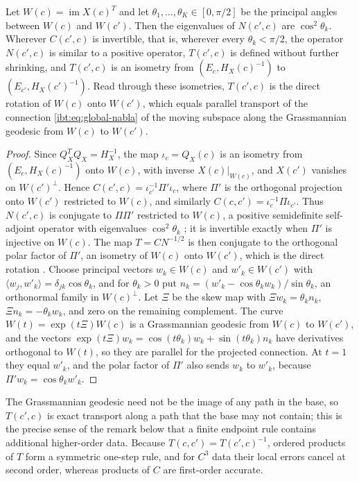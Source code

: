 Let $W(c)=\operatorname{im}X(c)^T$ and let $\theta_1,\dots,\theta_K\in[0,\pi/2]$ be the principal angles between $W(c)$ and $W(c')$. Then the eigenvalues of $N(c',c)$ are $\cos^2\theta_k$. Wherever $C(c',c)$ is invertible, that is, wherever every $\theta_k<\pi/2$, the operator $N(c',c)$ is similar to a positive operator, $T(c',c)$ is defined without further shrinking, and $T(c',c)$ is an isometry from $(E_c,H_X(c)^{-1})$ to $(E_{c'},H_X(c')^{-1})$. Read through these isometries, $T(c',c)$ is the direct rotation of $W(c)$ onto $W(c')$, which equals parallel transport of the connection \cref{ibt:eq:global-nabla} of the moving subspace along the Grassmannian geodesic from $W(c)$ to $W(c')$.
\begin{proof}
Since $Q_X^TQ_X=H_X^{-1}$, the map $\iota_c=Q_X(c)$ is an isometry from $(E_c,H_X(c)^{-1})$ onto $W(c)$, with inverse $X(c)|_{W(c)}$, and $X(c')$ vanishes on $W(c')^\perp$. Hence $C(c',c)=\iota_{c'}^{-1}\Pi'\iota_c$, where $\Pi'$ is the orthogonal projection onto $W(c')$ restricted to $W(c)$, and similarly $C(c,c')=\iota_c^{-1}\Pi\iota_{c'}$. Thus $N(c',c)$ is conjugate to $\Pi\Pi'$ restricted to $W(c)$, a positive semidefinite self-adjoint operator with eigenvalues $\cos^2\theta_k$ \citep{BjorckGolub1973}; it is invertible exactly when $\Pi'$ is injective on $W(c)$. The map $T=CN^{-1/2}$ is then conjugate to the orthogonal polar factor of $\Pi'$, an isometry of $W(c)$ onto $W(c')$, which is the direct rotation \citep{DavisKahan1970}. Choose principal vectors $w_k\in W(c)$ and $w'_k\in W(c')$ with $\langle w_j,w'_k\rangle=\delta_{jk}\cos\theta_k$, and for $\theta_k>0$ put $n_k=(w'_k-\cos\theta_k w_k)/\sin\theta_k$, an orthonormal family in $W(c)^\perp$. Let $\Xi$ be the skew map with $\Xi w_k=\theta_kn_k$, $\Xi n_k=-\theta_kw_k$, and zero on the remaining complement. The curve $W(t)=\exp(t\Xi)W(c)$ is a Grassmannian geodesic from $W(c)$ to $W(c')$, and the vectors $\exp(t\Xi)w_k=\cos(t\theta_k)w_k+\sin(t\theta_k)n_k$ have derivatives orthogonal to $W(t)$, so they are parallel for the projected connection. At $t=1$ they equal $w'_k$, and the polar factor of $\Pi'$ also sends $w_k$ to $w'_k$, because $\Pi'w_k=\cos\theta_kw'_k$.
\end{proof}

The Grassmannian geodesic need not be the image of any path in the base, so $T(c',c)$ is exact transport along a path that the base may not contain; this is the precise sense of the remark below that a finite endpoint rule contains additional higher-order data. Because $T(c,c')=T(c',c)^{-1}$, ordered products of $T$ form a symmetric one-step rule, and for $C^3$ data their local errors cancel at second order, whereas products of $C$ are first-order accurate.

